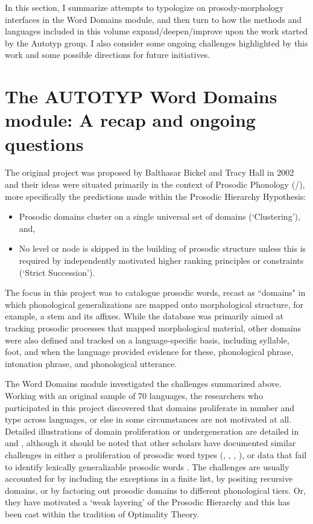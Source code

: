 \documentclass[output=paper]{langscibook}
\begin{document}
In this section, I summarize attempts to typologize on prosody-morphology interfaces in the Word Domains module, and then turn to how the methods and languages included in this volume expand/deepen/improve upon the work started by the Autotyp group. I also consider some ongoing challenges highlighted by this work and some possible directions for future initiatives.

\section{The AUTOTYP Word Domains module: A recap and ongoing questions}

The original project was proposed by Balthasar Bickel and Tracy Hall in 2002 and their ideas were situated primarily in the context of Prosodic Phonology (\citealt{nespor_prosodic_1986}/\citeyear{nespor2007prosodic}), more specifically the predictions made within the Prosodic Hierarchy Hypothesis:

\begin{itemize}
\item 
Prosodic domains cluster on a single universal set of domains (‘Clustering’), and,

\item 
No level or node is skipped in the building of prosodic structure unless this is required by independently motivated higher ranking principles or constraints (‘Strict Succession’).

\end{itemize}

The focus in this project was to catalogue prosodic words, recast as ``domains" in which phonological generalizations are mapped onto morphological structure, for example, a stem and its affixes. While the database was primarily aimed at tracking prosodic processes that mapped morphological material, other domains were also defined and tracked on a language-specific basis, including syllable, foot, and when the language provided evidence for these, phonological phrase, intonation phrase, and phonological utterance.

The Word Domains module investigated the challenges summarized above. Working with an original sample of 70 languages, the researchers who participated in this project discovered that domains proliferate in number and type across languages, or else in some circumstances are not motivated at all. Detailed illustrations of domain proliferation or undergeneration are detailed in \citet{hildebrandt2007grammatical} and \citet{schieringetal:2010}, although it should be noted that other scholars have documented similar challenges in either a proliferation of prosodic word types (\citealt{post_phonology_2009}, \citealt{dunn_grammar_1999}, \citealt{hall_phonological_2008}, \citealt{mcdonough_bipartite_nodate}), or data that fail to identify lexically generalizable prosodic words \citep{bickel2009distribution}. The challenges are usually accounted for by including the exceptions in a finite list, by positing recursive domains, or by factoring out prosodic domains to different phonological tiers. Or, they have motivated a `weak layering' of the Prosodic Hierarchy and this has been cast within the tradition of Optimality Theory.
\end{document}
